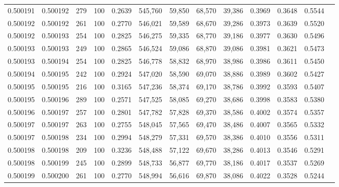 \begin{tabular}{rrrrrrrrrrrrr}
0.500191 & 0.500192 &   279 & 100 &                                     0.2639 & 545,760 &  59,850 &  68,570 &  39,386 & 0.3969 & 0.3648 & 0.5544 \\
0.500192 & 0.500192 &   261 & 100 &                                     0.2770 & 546,021 &  59,589 &  68,670 &  39,286 & 0.3973 & 0.3639 & 0.5520 \\
0.500192 & 0.500193 &   254 & 100 &                                     0.2825 & 546,275 &  59,335 &  68,770 &  39,186 & 0.3977 & 0.3630 & 0.5496 \\
0.500193 & 0.500193 &   249 & 100 &                                     0.2865 & 546,524 &  59,086 &  68,870 &  39,086 & 0.3981 & 0.3621 & 0.5473 \\
0.500193 & 0.500194 &   254 & 100 &                                     0.2825 & 546,778 &  58,832 &  68,970 &  38,986 & 0.3986 & 0.3611 & 0.5450 \\
0.500194 & 0.500195 &   242 & 100 &                                     0.2924 & 547,020 &  58,590 &  69,070 &  38,886 & 0.3989 & 0.3602 & 0.5427 \\
0.500195 & 0.500195 &   216 & 100 &                                     0.3165 & 547,236 &  58,374 &  69,170 &  38,786 & 0.3992 & 0.3593 & 0.5407 \\
0.500195 & 0.500196 &   289 & 100 &                                     0.2571 & 547,525 &  58,085 &  69,270 &  38,686 & 0.3998 & 0.3583 & 0.5380 \\
0.500196 & 0.500197 &   257 & 100 &                                     0.2801 & 547,782 &  57,828 &  69,370 &  38,586 & 0.4002 & 0.3574 & 0.5357 \\
0.500197 & 0.500197 &   263 & 100 &                                     0.2755 & 548,045 &  57,565 &  69,470 &  38,486 & 0.4007 & 0.3565 & 0.5332 \\
0.500197 & 0.500198 &   234 & 100 &                                     0.2994 & 548,279 &  57,331 &  69,570 &  38,386 & 0.4010 & 0.3556 & 0.5311 \\
0.500198 & 0.500198 &   209 & 100 &                                     0.3236 & 548,488 &  57,122 &  69,670 &  38,286 & 0.4013 & 0.3546 & 0.5291 \\
0.500198 & 0.500199 &   245 & 100 &                                     0.2899 & 548,733 &  56,877 &  69,770 &  38,186 & 0.4017 & 0.3537 & 0.5269 \\
0.500199 & 0.500200 &   261 & 100 &                                     0.2770 & 548,994 &  56,616 &  69,870 &  38,086 & 0.4022 & 0.3528 & 0.5244 \\

\end{tabular}
